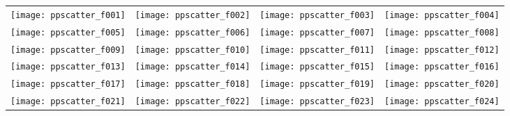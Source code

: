 \documentclass{article}
\begin{document}
\begin{figure}
\begin{tabular}{*{4}{@{}c@{}}}
    \texttt{[image: ppscatter\_f001]}&
    \texttt{[image: ppscatter\_f002]}&
    \texttt{[image: ppscatter\_f003]}&
    \texttt{[image: ppscatter\_f004]}\\
    \texttt{[image: ppscatter\_f005]}&
    \texttt{[image: ppscatter\_f006]}&
    \texttt{[image: ppscatter\_f007]}&
    \texttt{[image: ppscatter\_f008]}\\
    \texttt{[image: ppscatter\_f009]}&
    \texttt{[image: ppscatter\_f010]}&
    \texttt{[image: ppscatter\_f011]}&
    \texttt{[image: ppscatter\_f012]}\\
    \texttt{[image: ppscatter\_f013]}&
    \texttt{[image: ppscatter\_f014]}&
    \texttt{[image: ppscatter\_f015]}&
    \texttt{[image: ppscatter\_f016]}\\
    \texttt{[image: ppscatter\_f017]}&
    \texttt{[image: ppscatter\_f018]}&
    \texttt{[image: ppscatter\_f019]}&
    \texttt{[image: ppscatter\_f020]}\\
    \texttt{[image: ppscatter\_f021]}&
    \texttt{[image: ppscatter\_f022]}&
    \texttt{[image: ppscatter\_f023]}&
    \texttt{[image: ppscatter\_f024]}
\end{tabular}
\label{fig:scatterplots}
\end{figure}
\end{document}
